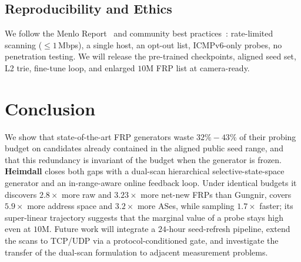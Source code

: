 \documentclass[conference]{IEEEtran}
\begin{document}
\subsection{Reproducibility and Ethics}
We follow the Menlo Report~\cite{menloreport} and community best
practices~\cite{partridge2016ethics,guo2018icmp,izhikevich2022lzr}:
rate-limited scanning ($\leq 1$\,Mbps), a single host, an opt-out
list, ICMPv6-only probes, no penetration testing.  We will release
the pre-trained checkpoints, aligned seed set, L2 trie, fine-tune
loop, and enlarged $10$M FRP list at camera-ready.

\section{Conclusion}\label{sec:conclusion}
We show that state-of-the-art FRP generators waste
$32\%\!-\!43\%$ of their probing budget on candidates already
contained in the aligned public seed range, and that this
redundancy is invariant of the budget when the generator is
frozen.  \textbf{Heimdall} closes both gaps with a dual-scan
hierarchical selective-state-space generator and an in-range-aware
online feedback loop.  Under identical budgets it discovers
$2.8\times$ more raw and $3.23\times$ more net-new FRPs than
Gungnir, covers $5.9\times$ more address space and $3.2\times$
more ASes, while sampling $1.7\times$ faster; its super-linear
trajectory suggests that the marginal value of a probe stays
high even at $10$M.  Future work will integrate a $24$-hour
seed-refresh pipeline, extend the scans to TCP/UDP via a
protocol-conditioned gate, and investigate the transfer of the
dual-scan formulation to adjacent measurement problems.
\end{document}
